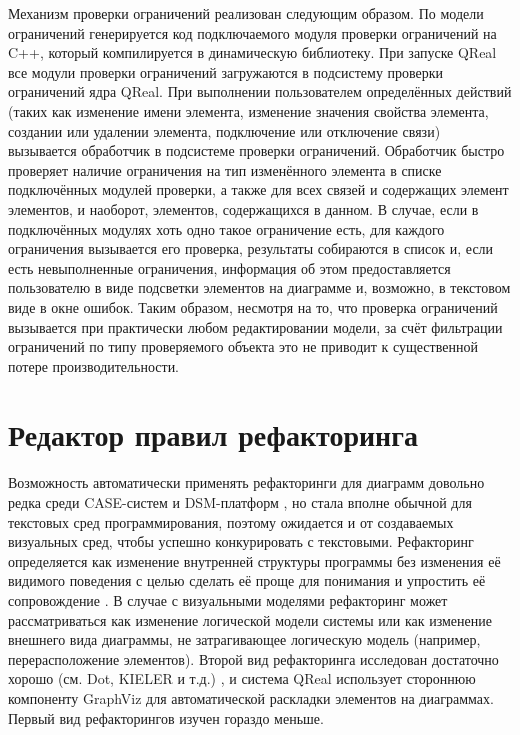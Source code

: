 Механизм проверки ограничений реализован следующим образом. По модели ограничений 
генерируется код подключаемого модуля проверки ограничений на C++, который компилируется 
в динамическую библиотеку. При запуске QReal все модули проверки ограничений загружаются 
в подсистему проверки ограничений ядра QReal. При выполнении пользователем определённых 
действий (таких как изменение имени элемента, изменение значения свойства элемента, 
создании или удалении элемента, подключение или отключение связи) вызывается обработчик 
в подсистеме проверки ограничений. Обработчик быстро проверяет наличие ограничения 
на тип изменённого элемента в списке подключённых модулей проверки, а также для всех 
связей и содержащих элемент элементов, и наоборот, элементов, содержащихся в данном. 
В случае, если в подключённых модулях хоть одно такое ограничение есть, для каждого 
ограничения вызывается его проверка, результаты собираются в список и, если есть невыполненные 
ограничения, информация об этом предоставляется пользователю в виде подсветки элементов 
на диаграмме и, возможно, в текстовом виде в окне ошибок. Таким образом, несмотря на то, 
что проверка ограничений вызывается при практически любом редактировании модели, за 
счёт фильтрации ограничений по типу проверяемого объекта это не приводит к существенной 
потере производительности.

\section{Редактор правил рефакторинга}
Возможность автоматически применять рефакторинги для диаграмм довольно редка среди CASE-систем и DSM-платформ
, но стала вполне обычной для текстовых сред программирования, поэтому ожидается и от создаваемых визуальных сред, чтобы успешно конкурировать с текстовыми. 
Рефакторинг определяется как изменение внутренней структуры программы без изменения 
её видимого поведения с целью сделать её проще для понимания и упростить её сопровождение
. В случае с визуальными моделями рефакторинг может рассматриваться как изменение логической 
модели системы или как изменение внешнего вида диаграммы, не затрагивающее логическую 
модель (например, перерасположение элементов). Второй вид рефакторинга исследован 
достаточно хорошо (см. Dot, KIELER и т.д.)
, и система QReal использует стороннюю компоненту GraphViz 
для автоматической раскладки элементов на диаграммах. Первый вид рефакторингов изучен 
гораздо меньше.


